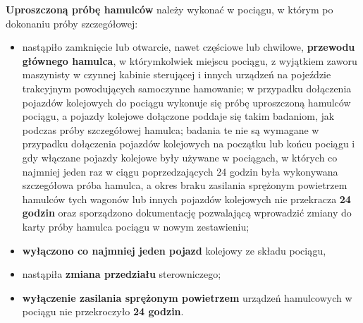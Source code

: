 \textbf{Uproszczoną próbę hamulców} należy wykonać w pociągu, w którym po dokonaniu próby szczegółowej:
\begin{itemize}
	\item nastąpiło zamknięcie lub otwarcie, nawet częściowe lub chwilowe, \textbf{przewodu głównego hamulca}, w którymkolwiek miejscu pociągu, z wyjątkiem zaworu maszynisty w czynnej kabinie sterującej i innych urządzeń na pojeździe trakcyjnym powodujących samoczynne hamowanie; w przypadku dołączenia pojazdów kolejowych do pociągu wykonuje się próbę uproszczoną hamulców pociągu, a pojazdy kolejowe dołączone poddaje się takim badaniom, jak podczas próby szczegółowej hamulca; badania te nie są wymagane w przypadku dołączenia pojazdów kolejowych na początku lub końcu pociągu i gdy włączane pojazdy kolejowe były używane w pociągach, w których co najmniej jeden raz w ciągu poprzedzających 24 godzin była wykonywana szczegółowa próba hamulca, a okres braku zasilania sprężonym powietrzem hamulców tych wagonów lub innych pojazdów kolejowych nie przekracza \textbf{24 godzin} oraz sporządzono dokumentację pozwalającą wprowadzić zmiany do karty próby hamulca pociągu w nowym zestawieniu;
	\item \textbf{wyłączono co najmniej jeden pojazd} kolejowy ze składu pociągu,
	\item nastąpiła \textbf{zmiana przedziału} sterowniczego;
	\item \textbf{wyłączenie zasilania sprężonym powietrzem} urządzeń hamulcowych w pociągu nie przekroczyło \textbf{24 godzin}.
\end{itemize}

